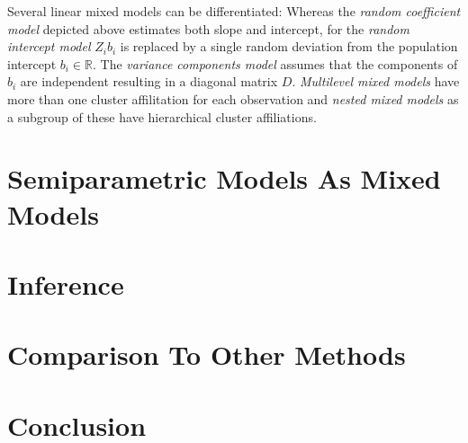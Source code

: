 \documentclass[12pt]{article}
\begin{document}
Several linear mixed models can be differentiated:
Whereas the \textit{random coefficient model} depicted above estimates both slope and intercept, for the \textit{random intercept model} $Z_ib_i$ is replaced by a single random deviation from the population intercept $b_i \in \mathbb{R}$. The \textit{variance components model} assumes that the components of $b_i$ are independent resulting in a diagonal matrix $D$.
\textit{Multilevel mixed models} have more than one cluster affilitation for each observation and \textit{nested mixed models} as a subgroup of these have hierarchical cluster affiliations.


\section{Semiparametric Models As Mixed Models}

\section{Inference}

\section{Comparison To Other Methods}

\section{Conclusion}





\newpage
\printbibliography
\end{document}
